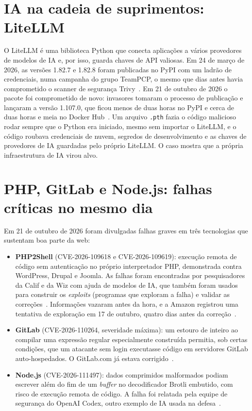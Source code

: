\documentclass[12pt,openright,oneside,a4paper,english,brazil]{abntex2}
\begin{document}
\section{IA na cadeia de suprimentos: LiteLLM}

O LiteLLM é uma biblioteca Python que conecta aplicações a vários provedores de modelos de IA e, por isso, guarda chaves de API valiosas. Em 24 de março de 2026, as versões 1.82.7 e 1.82.8 foram publicadas no PyPI com um ladrão de credenciais, numa campanha do grupo TeamPCP, o mesmo que dias antes havia comprometido o scanner de segurança Trivy~\cite{helpnet-litellm,bleeping-litellm}. Em 21 de outubro de 2026 o pacote foi comprometido de novo: invasores tomaram o processo de publicação e lançaram a versão 1.107.0, que ficou menos de duas horas no PyPI e cerca de duas horas e meia no Docker Hub~\cite{bleeping-litellm-out}. Um arquivo \texttt{.pth} fazia o código malicioso rodar sempre que o Python era iniciado, mesmo sem importar o LiteLLM, e o código roubava credenciais de nuvem, segredos de desenvolvimento e as chaves de provedores de IA guardadas pelo próprio LiteLLM. O caso mostra que a própria infraestrutura de IA virou alvo.

\section{PHP, GitLab e Node.js: falhas críticas no mesmo dia}

Em 21 de outubro de 2026 foram divulgadas falhas graves em três tecnologias que sustentam boa parte da web:

\begin{itemize}
  \item \textbf{PHP2Shell} (CVE-2026-109618 e CVE-2026-109619): execução remota de código sem autenticação no próprio interpretador PHP, demonstrada contra WordPress, Drupal e Joomla. As falhas foram encontradas por pesquisadores da Calif e da Wiz com ajuda de modelos de IA, que também foram usados para construir os \emph{exploits} (programas que exploram a falha) e validar as correções~\cite{wiz-php2shell,alura-php2shell}. Informações vazaram antes da hora, e a Amazon registrou uma tentativa de exploração em 17 de outubro, quatro dias antes da correção~\cite{alura-php2shell}.
  \item \textbf{GitLab} (CVE-2026-110264, severidade máxima): um estouro de inteiro ao compilar uma expressão regular especialmente construída permitia, sob certas condições, que um atacante sem login executasse código em servidores GitLab auto-hospedados. O GitLab.com já estava corrigido~\cite{bleeping-gitlab}.
  \item \textbf{Node.js} (CVE-2026-111497): dados comprimidos malformados podiam escrever além do fim de um \emph{buffer} no decodificador Brotli embutido, com risco de execução remota de código. A falha foi relatada pela equipe de segurança do OpenAI Codex, outro exemplo de IA usada na defesa~\cite{nodejs-outubro}.
\end{itemize}
\end{document}
